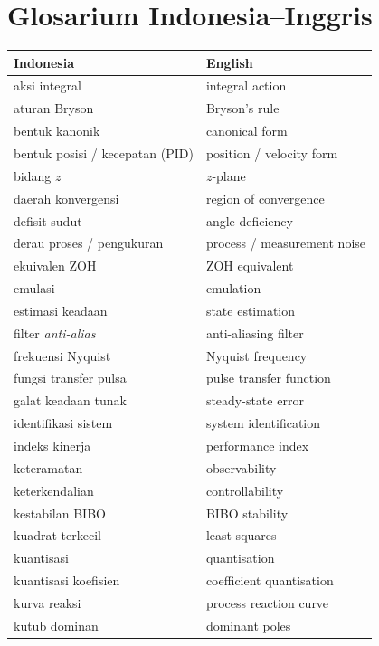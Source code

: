 \chapter{Glosarium Indonesia--Inggris}

\begin{center}
	\small
	\renewcommand{\arraystretch}{1.15}
	\begin{longtable}{@{}p{} p{}@{}}
		\toprule
		\textbf{Indonesia} & \textbf{English} \\
		\midrule
		\endhead
		aksi integral & integral action \\
		aturan Bryson & Bryson's rule \\
		bentuk kanonik & canonical form \\
		bentuk posisi / kecepatan (PID) & position / velocity form \\
		bidang $z$ & $z$-plane \\
		daerah konvergensi & region of convergence \\
		defisit sudut & angle deficiency \\
		derau proses / pengukuran & process / measurement noise \\
		ekuivalen ZOH & ZOH equivalent \\
		emulasi & emulation \\
		estimasi keadaan & state estimation \\
		filter \textit{anti-alias} & anti-aliasing filter \\
		frekuensi Nyquist & Nyquist frequency \\
		fungsi transfer pulsa & pulse transfer function \\
		galat keadaan tunak & steady-state error \\
		identifikasi sistem & system identification \\
		indeks kinerja & performance index \\
		keteramatan & observability \\
		keterkendalian & controllability \\
		kestabilan BIBO & BIBO stability \\
		kuadrat terkecil & least squares \\
		kuantisasi & quantisation \\
		kuantisasi koefisien & coefficient quantisation \\
		kurva reaksi & process reaction curve \\
		kutub dominan & dominant poles \\

\end{longtable}
\end{center}

